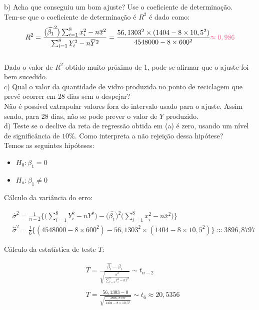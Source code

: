 \noindent b) Acha que conseguiu um bom ajuste? Use o coeficiente de determinação.\\

Tem-se que o coeficiente de determinação é $R^2$ é dado como:\\

\[
    R^2 = \frac{\bigl(\widehat{\beta_1}^2\bigr)\sum_{i=1}^{8}x_i^2-n\overbar{x}^2}{\sum_{i=1}^{8}Y_i^2-n\overbar{Y}^2} = \frac{56,1303^2\times(1404-8\times 10,5^2)}{4548000-8\times600^2} \textcolor{COLOR2}{\approx 0,986}
\]
\\

Dado o valor de $R^2$ obtido muito próximo de 1, pode-se afirmar que o ajuste foi bem sucedido.\\

\noindent c) Qual o valor da quantidade de vidro produzida no ponto de reciclagem que prevê ocorrer em 28 dias sem o despejar?\\

Não é possível extrapolar valores fora do intervalo usado para o ajuste. Assim sendo, para 28 dias, \textcolor{COLOR2}{não se pode prever o valor de $Y$ produzido.}\\


\noindent d) Teste se o declive da reta de regressão obtida em (a) é zero, usando um nível de significância de $10\%$. Como interpreta a não rejeição dessa hipótese?\\

Temos as seguintes hipóteses:
\begin{itemize}
    \item $H_0: \beta_1 = 0$
    \item $H_a: \beta_1 \neq 0$
\end{itemize}

Cálculo da variância do erro:

\[
    \begin{split}
        &\widehat{\sigma}^2 = \frac{1}{n-2}\biggl\{ \biggl(\sum_{i=1}^{8}Y_i^2 - nY^2\biggr)- \bigl(\widehat{\beta_1}\bigr)^2\biggl(\sum_{i=1}^{8}x_i^2 - n\overbar{x}^2\biggr)\biggr\}\\
        &\widehat{\sigma}^2 = \frac{1}{6}\{(4548000-8\times600^2) - 56,1303^2\times(1404-8\times 10,5^2)\} \approx 3896,8797
    \end{split}
\]

Cálculo da estatística de teste $T$:

\[
    \begin{split}
        &T = \frac{\widehat{\beta_1} - \beta_1 }{\sqrt{\frac{\widehat{\sigma}^2}{\sum_{i=1}^{8}x_i^2 - n\overbar{x}^2}}} \sim t_{n-2}\\ \\
        &T = \frac{56,1303 - 0}{\sqrt{\frac{3896,8797}{1404-8\times10,5^2}}} \sim t_{6} \approx 20,5356
    \end{split}
\]

